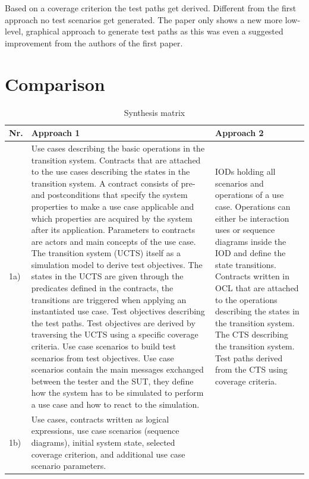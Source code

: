 Based on a coverage criterion the test paths get derived. Different from the first approach no test scenarios get generated. The paper only shows a new more low-level, graphical approach to generate test paths as this was even a suggested improvement from the authors of the first paper. 

\newpage
\section{Comparison} \label{comparison}
\begin{small}
\begin{longtable}[h]{p{0.45cm}|p{}|p{}}
	\caption{Synthesis matrix}
	\label{tab3:synthesismatrix}
	\\    %
	\hline
	\textbf{Nr.} & \textbf{Approach 1} & \textbf{Approach 2} \\
	\hline
	1a) & 
	Use cases describing the basic operations in the transition system. Contracts that are attached to the use cases describing the states in the transition system. A contract consists of pre- and postconditions that specify the system properties to make a use case applicable and which properties are acquired by the system after its application. Parameters to contracts are actors and main concepts of the use case. The transition system (UCTS) itself as a simulation model to derive test objectives. The states in the UCTS are given through the predicates defined in the contracts, the transitions are triggered when applying an instantiated use case. Test objectives describing the test paths. Test objectives are derived by traversing the UCTS using a specific coverage criteria. Use case scenarios to build test scenarios from test objectives. Use case scenarios contain the main messages exchanged between the tester and the SUT, they define how the system has to be simulated to perform a use case and how to react to the simulation. & 
	IODs holding all scenarios and operations of a use case. Operations can either be interaction uses or sequence diagrams inside the IOD and define the state transitions. Contracts written in OCL that are attached to the operations describing the states in the transition system. The CTS describing the transition system. Test paths derived from the CTS using coverage criteria.  \\
	\hline
	1b) & 
	Use cases, contracts written as logical expressions, use case scenarios (sequence diagrams), initial system state, selected coverage criterion, and additional use case scenario parameters. & 

\end{longtable}
\end{small}
